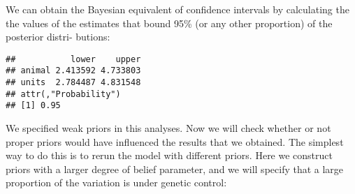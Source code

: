 \documentclass[12pt,]{book}
\newenvironment{Shaded}{\begin{snugshade}}{\end{snugshade}}
\newcommand{\DataTypeTok}[1]{\textcolor[rgb]{0.13,0.29,0.53}{#1}}
\newcommand{\DecValTok}[1]{\textcolor[rgb]{0.00,0.00,0.81}{#1}}
\newcommand{\FloatTok}[1]{\textcolor[rgb]{0.00,0.00,0.81}{#1}}
\newcommand{\KeywordTok}[1]{\textcolor[rgb]{0.13,0.29,0.53}{\textbf{#1}}}
\newcommand{\NormalTok}[1]{#1}
\newcommand{\OperatorTok}[1]{\textcolor[rgb]{0.81,0.36,0.00}{\textbf{#1}}}
\newcommand{\OtherTok}[1]{\textcolor[rgb]{0.56,0.35,0.01}{#1}}
\newcommand{\StringTok}[1]{\textcolor[rgb]{0.31,0.60,0.02}{#1}}
\begin{document}
We can obtain the Bayesian equivalent of confidence intervals by calculating the the values of the estimates that bound 95\% (or any other proportion) of the posterior distri- butions:

\begin{Shaded}
\end{Shaded}

\begin{verbatim}
##           lower    upper
## animal 2.413592 4.733803
## units  2.784487 4.831548
## attr(,"Probability")
## [1] 0.95
\end{verbatim}

We specified weak priors in this analyses. Now we will check whether or not proper priors would have influenced the results that we obtained. The simplest way to do this is to rerun the model with different priors. Here we construct priors with a larger degree of belief parameter, and we will specify that a large proportion of the variation is under genetic control:

\begin{Shaded}
\end{Shaded}
\end{document}
